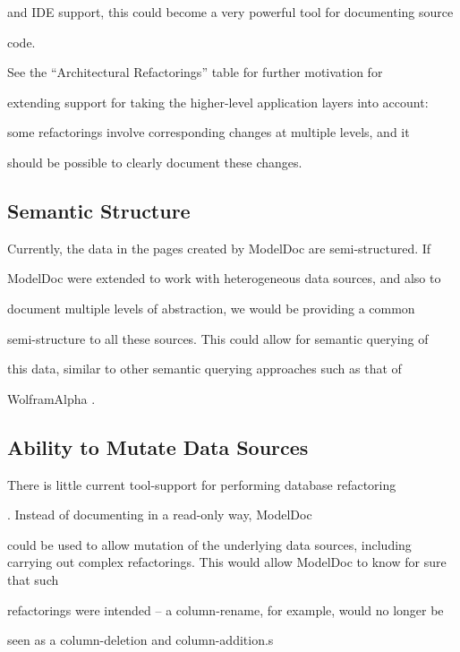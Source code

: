 \documentclass{acm_proc_article-sp}
\begin{document}
and IDE support, this could become a very powerful tool for documenting source

code.



See the ``Architectural Refactorings'' table for further motivation for

extending support for taking the higher-level application layers into account:

some refactorings involve corresponding changes at multiple levels, and it

should be possible to clearly document these changes.



\subsection{Semantic Structure}



Currently, the data in the pages created by ModelDoc are semi-structured.  If

ModelDoc were extended to work with heterogeneous data sources, and also to

document multiple levels of abstraction, we would be providing a common

semi-structure to all these sources.  This could allow for semantic querying of

this data, similar to other semantic querying approaches such as that of

WolframAlpha \cite{web:wolfram}.



\subsection{Ability to Mutate Data Sources}



There is little current tool-support for performing database refactoring

\cite{ambler:refactoring}.  Instead of documenting in a read-only way, ModelDoc

could be used to allow mutation of the underlying data sources, including carrying out complex refactorings.  This would allow ModelDoc to know for sure that such

refactorings were intended -- a column-rename, for example, would no longer be

seen as a column-deletion and column-addition.s
\end{document}
